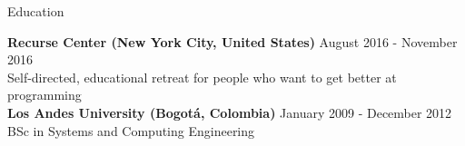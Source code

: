 \documentclass{resume} %
\def\uniandes{Los Andes University }
\def\recurse_center{Recurse Center }
\begin{document}


\begin{rSection}{Education}

{\bf \recurse_center (New York City, United States)} \hfill August 2016 - November 2016 \\
Self-directed, educational retreat for people who want to get better at programming \\

{\bf \uniandes (Bogot\'a, Colombia)} \hfill January 2009 - December 2012 \\ 
BSc in Systems and Computing Engineering \\

\end{rSection}

\end{document}
